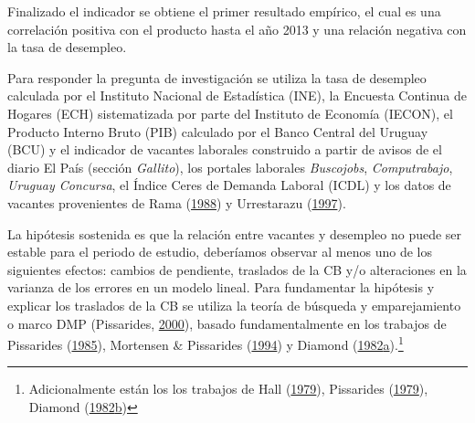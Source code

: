 \documentclass[12pt,oneside]{reedthesis}
\begin{document}
Finalizado el indicador se obtiene el primer resultado empírico, el cual es una correlación positiva con el producto hasta el año 2013 y una relación negativa con la tasa de desempleo.

Para responder la pregunta de investigación se utiliza la tasa de desempleo calculada por el Instituto Nacional de Estadística (INE), la Encuesta Continua de Hogares (ECH) sistematizada por parte del Instituto de Economía (IECON), el Producto Interno Bruto (PIB) calculado por el Banco Central del Uruguay (BCU) y el indicador de vacantes laborales construido a partir de avisos de el diario El País (sección \emph{Gallito}), los portales laborales \emph{Buscojobs}, \emph{Computrabajo}, \emph{Uruguay Concursa}, el Índice Ceres de Demanda Laboral (ICDL) y los datos de vacantes provenientes de Rama (\protect\hyperlink{ref-Rama1988}{1988}) y Urrestarazu (\protect\hyperlink{ref-Urrestarazu1997}{1997}).

La hipótesis sostenida es que la relación entre vacantes y desempleo no puede ser estable para el periodo de estudio, deberíamos observar al menos uno de los siguientes efectos: cambios de pendiente, traslados de la CB y/o alteraciones en la varianza de los errores en un modelo lineal. Para fundamentar la hipótesis y explicar los traslados de la CB se utiliza la teoría de búsqueda y emparejamiento o marco DMP (Pissarides, \protect\hyperlink{ref-Pissarides2000}{2000}), basado fundamentalmente en los trabajos de Pissarides (\protect\hyperlink{ref-Pissarides1985}{1985}), Mortensen \& Pissarides (\protect\hyperlink{ref-Mortensen1994}{1994}) y Diamond (\protect\hyperlink{ref-Diamond1982}{1982}\protect\hyperlink{ref-Diamond1982}{a}).\footnote{Adicionalmente están los los trabajos de Hall (\protect\hyperlink{ref-Hall1979}{1979}), Pissarides (\protect\hyperlink{ref-Pissarides1979}{1979}), Diamond (\protect\hyperlink{ref-Diamond1982B}{1982}\protect\hyperlink{ref-Diamond1982B}{b})}
\end{document}
